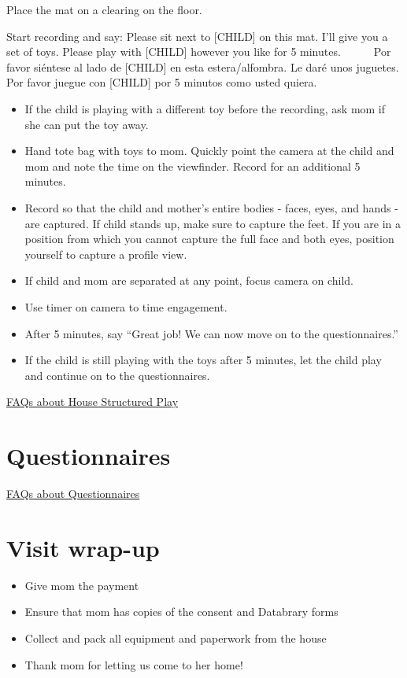 \documentclass[
]{book}
\providecommand{\tightlist}{%
  \setlength{\itemsep}{0pt}\setlength{\parskip}{0pt}}
\begin{document}
Place the mat on a clearing on the floor.

Start recording and say: Please sit next to {[}CHILD{]} on this mat. I'll give you a set of toys. Please play with {[}CHILD{]} however you like for 5 minutes.
    Por favor siéntese al lado de {[}CHILD{]} en esta estera/alfombra. Le daré unos juguetes. Por favor juegue con {[}CHILD{]} por 5 minutos como usted quiera.

\begin{itemize}
\tightlist
\item
  If the child is playing with a different toy before the recording, ask mom if she can put the toy away.
\item
  Hand tote bag with toys to mom. Quickly point the camera at the child and mom and note the time on the viewfinder. Record for an additional 5 minutes.
\item
  Record so that the child and mother's entire bodies - faces, eyes, and hands - are captured. If child stands up, make sure to capture the feet. If you are in a position from which you cannot capture the full face and both eyes, position yourself to capture a profile view.
\item
  If child and mom are separated at any point, focus camera on child.
\item
  Use timer on camera to time engagement.
\item
  After 5 minutes, say ``Great job! We can now move on to the questionnaires.''
\item
  If the child is still playing with the toys after 5 minutes, let the child play and continue on to the questionnaires.
\end{itemize}

\protect\hyperlink{faqs_structured_play}{FAQs about House Structured Play}

\hypertarget{questionnaires}{%
\section{Questionnaires}\label{questionnaires}}

\protect\hyperlink{faqs_questionnaires}{FAQs about Questionnaires}

\hypertarget{visit-wrap-up}{%
\section{Visit wrap-up}\label{visit-wrap-up}}

\begin{itemize}
\tightlist
\item
  Give mom the payment
\item
  Ensure that mom has copies of the consent and Databrary forms
\item
  Collect and pack all equipment and paperwork from the house
\item
  Thank mom for letting us come to her home!
\end{itemize}
\end{document}
